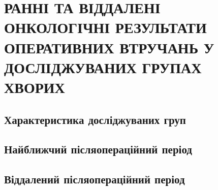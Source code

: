 \chapter{РАННІ ТА ВІДДАЛЕНІ ОНКОЛОГІЧНІ РЕЗУЛЬТАТИ ОПЕРАТИВНИХ ВТРУЧАНЬ У ДОСЛІДЖУВАНИХ ГРУПАХ ХВОРИХ}

\section{Характеристика досліджуваних груп}
\section{Найближчий післяопераційний період}
\section{Віддалений післяопераційний період}